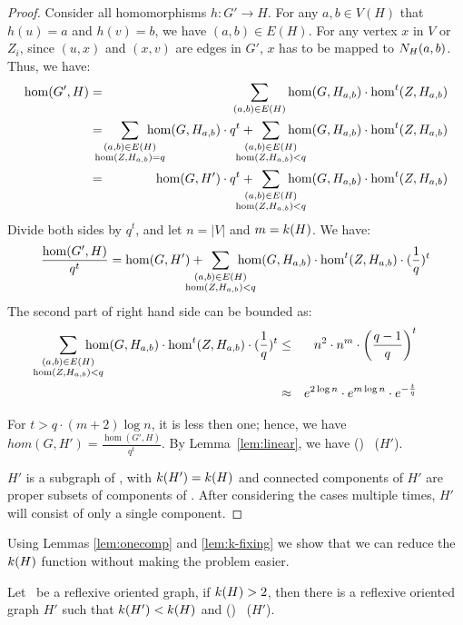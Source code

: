 \begin{proof}
Consider all homomorphisms \(h: G'\to H\)\@.
For any \(a,b\in V(H)\) that \(h(u)=a\) and \(h(v)=b\), we have \((a,b)\in E(H)\)\@.
For any vertex \(x\) in \(V\) or \(Z_i\), since \((u,x)\) and \((x,v)\) are edges in \(G'\), 
\(x\) has to be mapped to \(N_{H}({a},{b})\)\@. Thus, we have:
\begin{eqnarray*}
\hom(G',H) &=&
\sum_{(a,b)\in E(H)} \hom(G,H_{a,b}) \cdot \hom^t(Z, H_{a,b}) \\
&=&
\bigsum{\substack{(a,b)\in E(H)\\ \hom(Z, H_{a,b}) = q}} \hom(G, H_{a,b}) \cdot q^t + 
\bigsum{\substack{(a,b)\in E(H)\\ \hom(Z, H_{a,b}) < q}} 
\hom(G, H_{a,b}) \cdot \hom^t(Z,H_{a,b})\\
&=&
\hom(G,H') \cdot q^t + \bigsum{\substack{(a,b)\in E(H)\\ \hom(Z, H_{a,b}) < q}} 
\hom(G, H_{a,b}) \cdot \hom^t(Z,H_{a,b})
\end{eqnarray*}
Divide both sides by \(q^t\), and let \(n=|V|\) and \(m=k(H)\)\@. We have:
\[
\frac{\hom(G',H)}{q^t} = 
\hom(G,H') + 
\bigsum{\substack{(a,b)\in E(H)\\ \hom(Z, H_{a,b}) < q}} 
\hom(G, H_{a,b}) \cdot \hom^t(Z,H_{a,b}) \cdot (\frac{1}{q})^t
\]
The second part of right hand side can be bounded as:
\begin{eqnarray*}
\bigsum{\substack{(a,b)\in E(H)\\ \hom(Z, H_{a,b}) < q}} 
\hom(G, H_{a,b}) \cdot \hom^t(Z,H_{a,b}) \cdot (\frac{1}{q})^t & \le &
n^2 \cdot n^m \cdot \left(\frac{q-1}{q}\right)^t\\
& \approx & e ^ {2\log n} \cdot e^{m\log n} \cdot e^{-\frac{t}{q}} \\
\end{eqnarray*}

For \(t > q \cdot (m+2)\log n\), it is less then one; hence, we have
\(hom(G,H')=\frac{\hom(G',H)}{q^t}\)\@. By Lemma~\ref{lem:linear},
we have \chom(\mH) \mapge\ \chom(\(H'\)). 

\(H'\) is a subgraph of \mH, with \(k(H')=k(H)\) and connected components of \(H'\)
are proper subsets of components of \mH\@. After considering the cases multiple times,
\(H'\) will consist of only a single component.
\end{proof}

Using Lemmas \ref{lem:onecomp} and \ref{lem:k-fixing} we show that we can reduce the 
\(k(H)\) function without making the problem easier.

\begin{lemma} \label{lem:k-reduction}
Let \mH\ be a reflexive oriented graph, if \(k(H) > 2\), then
there is a reflexive oriented graph \(H'\) such that \(k(H') < k(H)\)
and \chom(\mH) \mapge\ \chom(\(H'\))\@.
\end{lemma}

